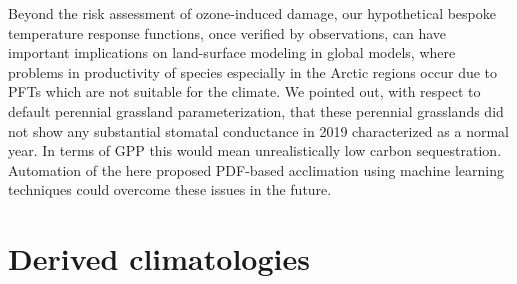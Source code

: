\documentclass[bg, manuscript]{copernicus}
\begin{document}
Beyond the risk assessment of ozone-induced damage, our hypothetical bespoke temperature response functions, once verified by observations, can have important implications on land-surface modeling in global models, where problems in productivity of species especially in the Arctic regions occur due to PFTs which are not suitable for the climate. We pointed out, with respect to default perennial grassland parameterization, that these perennial grasslands did not show any substantial stomatal conductance in 2019 characterized as a normal year. In terms of GPP this would mean unrealistically low carbon sequestration. Automation of the here proposed PDF-based acclimation using machine learning techniques could overcome these issues in the future.











\clearpage

\appendix
\section{Derived climatologies}    %

\end{document}
